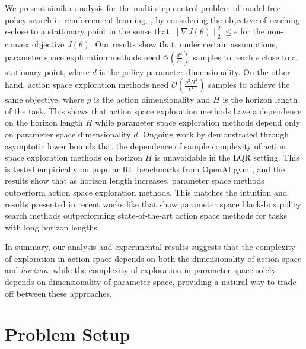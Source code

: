 We present similar analysis for the multi-step control problem of model-free policy search in reinforcement learning, \citep{kober2013reinforcement}, by considering the objective of reaching $\epsilon$-close to a stationary point in the sense that $\|\nabla J(\theta)\|_2^2 \leq \epsilon$ for the non-convex objective $J(\theta)$. Our results show that, under certain assumptions, parameter space exploration methods 
%
need $\mathcal{O}(\frac{d^2}{\epsilon^3})$ samples to reach $\epsilon$ close to a stationary point, where $d$ is the policy parameter dimensionality. On the other hand, action space exploration methods need $\mathcal{O}(\frac{p^2H^4}{\epsilon^4})$ samples to achieve the same objective, where $p$ is the action dimensionality and $H$ is the horizon length of the task. This shows that action space exploration methods have a dependence on the horizon length $H$ %
while parameter space exploration methods depend only on parameter space dimensionality $d$.
%
Ongoing work by \cite{tu2018gap} demonstrated through asymptotic lower bounds that the dependence of sample complexity of action space exploration methods on horizon $H$ is unavoidable in the LQR setting.
This is tested empirically on popular RL benchmarks from OpenAI gym \citep{openaigym}, and the results show that as horizon length increases, parameter space methods outperform action space exploration methods. This matches the intuition and results presented in recent works like \citep{bagnell2001autonomous,szita2006learning,tesch2011using,salimans2017evolution, mania2018simple}
%
that show parameter space black-box policy search methods outperforming state-of-the-art action space methods for tasks with long horizon lengths.

In summary, our analysis and experimental results suggests that the
complexity of exploration in action space depends on both the
dimensionality of action space and \emph{horizon}, while the
complexity of exploration in parameter space solely depends on
dimensionality of parameter space, providing a natural way to trade-off
between these approaches.

%
%
%

%

%
%
%


%

%

%

\section{Problem Setup}
\label{sec:problem_define}


